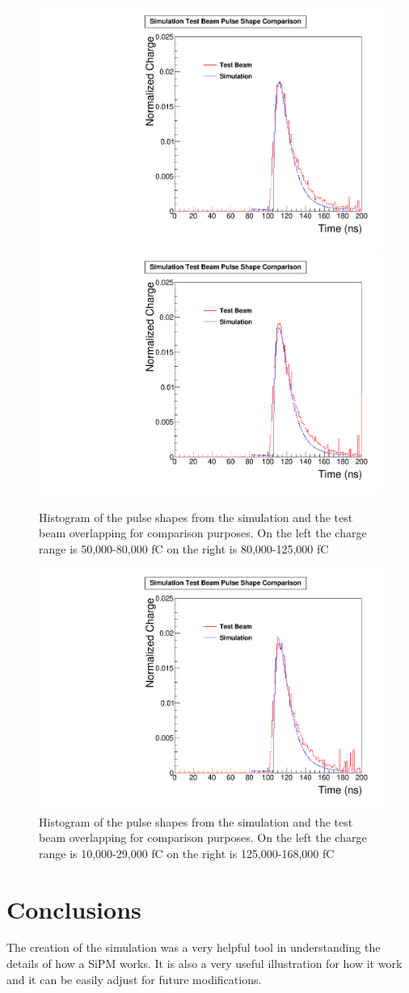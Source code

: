 \begin{figure}
\centering
\includegraphics[width=0.495\linewidth]{Figures/50Comparison.pdf}
\includegraphics[width=0.495\linewidth]{Figures/80Comparison.pdf}
\caption{Histogram of the pulse shapes from the simulation and the test beam overlapping for comparison purposes. On the left the charge range is 50,000-80,000 fC on the right is 80,000-125,000 fC}
\label{fig:2comparison_together}
\end{figure}

\begin{figure}
\centering
\includegraphics[width=0.495\linewidth]{Figures/125Comparison.pdf}
\caption{Histogram of the pulse shapes from the simulation and the test beam overlapping for comparison purposes. On the left the charge range is 10,000-29,000 fC on the right is 125,000-168,000 fC}
\label{fig:3comparison_together}
\end{figure}

\section{Conclusions}

The creation of the simulation was a very helpful tool in understanding the details of how a SiPM works. It is also a very useful illustration for how it work and it can be easily adjust for future modifications. 